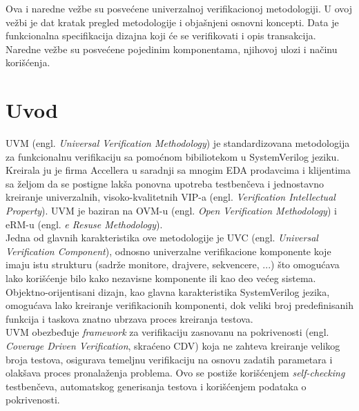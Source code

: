 %
% 

Ova i naredne vežbe su posvećene univerzalnoj verifikacionoj metodologiji.
U ovoj vežbi je dat kratak pregled metodologije i objašnjeni osnovni koncepti.
Data je funkcionalna specifikacija dizajna koji će se verifikovati i opis
transakcija.
Naredne vežbe su posvećene pojedinim komponentama, njihovoj ulozi i načinu
korišćenja.


\section{Uvod}

UVM (engl. \emph{Universal Verification Methodology}) je standardizovana
metodologija za funkcionalnu verifikaciju sa pomoćnom bibiliotekom u
SystemVerilog jeziku. Kreirala ju je firma Accellera u saradnji sa mnogim EDA
prodavcima i klijentima sa željom da se postigne lakša ponovna upotreba
testbenčeva i jednostavno kreiranje univerzalnih, visoko-kvalitetnih VIP-a
(engl. \emph{Verification Intellectual Property}). UVM je baziran na OVM-u
(engl. \emph{Open Verification Methodology}) i eRM-u (engl. \emph{e Resuse
  Methodology}).\\

Jedna od glavnih karakteristika ove metodologije je UVC (engl. \emph{Universal
  Verification Component}), odnosno univerzalne verifikacione komponente koje
imaju istu strukturu (sadrže monitore, drajvere, sekvencere, ...) što omogućava
lako korišćenje bilo kako nezavisne komponente ili kao deo većeg sistema.\\

Objektno-orijentisani dizajn, kao glavna karakteristika SystemVerilog jezika,
omogućava lako kreiranje verifikacionih komponenti, dok veliki broj
predefinisanih funkcija i taskova znatno ubrzava proces kreiranja testova.\\

UVM obezbeđuje \emph{framework} za verifikaciju zasnovanu na pokrivenosti
(engl. \emph{Coverage Driven Verification}, skraćeno CDV) koja ne zahteva
kreiranje velikog broja testova, osigurava temeljnu verifikaciju na osnovu
zadatih parametara i olakšava proces pronalaženja problema. Ovo se postiže
korišćenjem \emph{self-checking} testbenčeva, automatskog generisanja testova i
korišćenjem podataka o pokrivenosti.

